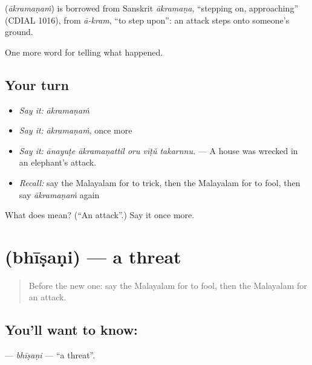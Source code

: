\begin{cousinweb}
\textbf{} (\emph{ākramaṇaṁ}) is borrowed from Sanskrit \emph{ākramaṇa}, \textquotedblleft{}stepping on, approaching\textquotedblright{} (CDIAL 1016), from \emph{ā-kram}, \textquotedblleft{}to step upon\textquotedblright{}: an attack steps onto someone's ground.
\end{cousinweb}

\begin{grammarlens}[title={What you've built}]
One more word for telling what happened.
\end{grammarlens}

\subsection*{Your turn}
\begin{itemize}
\raggedright
  \item \emph{Say it:} \emph{ākramaṇaṁ}
  \item \emph{Say it:} \emph{ākramaṇaṁ}, once more
  \item \emph{Say it:} \emph{ānayuṭe ākramaṇattil oru vīṭŭ takarnnu.} — A house was wrecked in an elephant's attack.
  \item \emph{Recall:} say the Malayalam for to trick, then the Malayalam for to fool, then say \emph{ākramaṇaṁ} again
\end{itemize}

\begin{tcolorbox}[breakable,colback=teal!4,colframe=teal!35!black,title={Before you move on}]
What does  mean? (\textquotedblleft{}An attack\textquotedblright{}.) Say it once more.
\end{tcolorbox}
\section[\texorpdfstring{\ml{ഭീഷണി} (bhīṣaṇi)}{ഭീഷണി (bhīṣaṇi)}]{ (bhīṣaṇi) — a threat}

\label{lesson:ML-C373-bhisani}



\begin{quote}
Before the new one: say the Malayalam for to fool, then the Malayalam for an attack.
\end{quote}

\subsection*{You'll want to know: }
\textbf{} — \emph{bhīṣaṇi} — \textquotedblleft{}a threat\textquotedblright{}.

